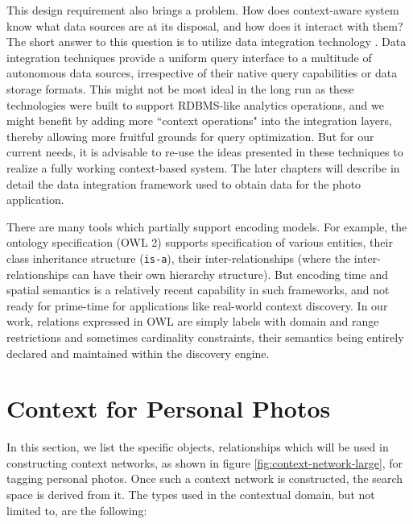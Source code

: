 This design requirement also brings a problem. How does context-aware system know what data sources are at its disposal, and how does it interact with them? The short answer to this question is to utilize data integration technology \cite{doan2005semantic, halevy2001answering, lenzerini2002data}. Data integration techniques provide a uniform query interface to a multitude of autonomous data sources, irrespective of their native query capabilities or data storage formats. This might not be most ideal in the long run as these technologies were built to support RDBMS-like analytics operations, and we might benefit by adding more ``context operations" into the integration layers, thereby allowing more fruitful grounds for query optimization. But for our current needs, it is advisable to re-use the ideas presented in these techniques to realize a fully working context-based system. The later chapters will describe in detail the data integration framework used to obtain data for the photo application.

There are many tools which partially support encoding models. For example, the ontology specification (OWL 2) supports specification of various entities, their class inheritance structure (\texttt{is-a}), their inter-relationships (where the inter-relationships can have their own hierarchy structure). But encoding time and spatial semantics is a relatively recent capability \cite{hobbs2006time} in such frameworks, and not ready for prime-time for applications like real-world context discovery. In our work, relations expressed in OWL are simply labels with domain and range restrictions and sometimes cardinality constraints, their semantics being entirely declared and maintained within the discovery engine.

\section{Context for Personal Photos}
In this section, we list the specific objects, relationships which will be used in constructing context networks, as shown in figure \ref{fig:context-network-large}, for tagging personal photos. Once such a context network is constructed, the search space is derived from it. The types used in the contextual domain, but not limited to, are the following:

